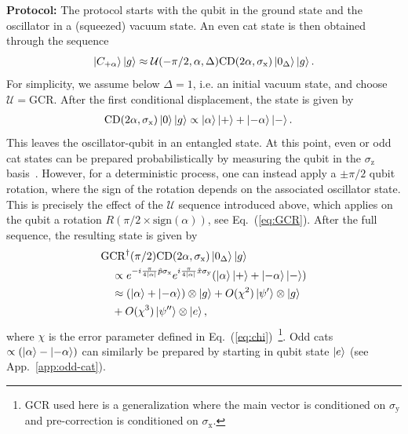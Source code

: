 \documentclass[aps,prx,showpacs,notitlepage,twocolumn,superscriptaddress,nofootinbib,preprintnumbers,floatfix,10pt, longbibliography]{revtex4-2}
\begin{document}
\par\textbf{Protocol:} The protocol starts with the qubit in the ground state and the oscillator in a (squeezed) vacuum state. An even cat state is then obtained through the sequence
\begin{equation}
    \ket{C_{+\alpha}} \ket{g} \approx \mathcal U(-\pi/2,\alpha,\Delta) \mathrm{CD}(2\alpha,\sigma_\mathrm{x}) \ket{0_\Delta}\ket{g}.
\end{equation}
For simplicity, we assume below $\Delta=1$, i.e. an initial vacuum state, and choose $\mathcal U = \mathrm{GCR}$. After the first conditional displacement, the state is given by
\begin{align}
  \mathrm{CD}(2\alpha,\sigma_\mathrm{x})\ket{0}\ket{g}&\propto\ket{\alpha}\ket{+}+\ket{-\alpha}\ket{-}.
\end{align} 
This leaves the oscillator-qubit in an entangled state. At this point, even or odd cat states can be prepared probabilistically by measuring the qubit in the $\sigma_\mathrm{z}$ basis~\cite{sun2014tracking,wineland2013nobel,haroche2013nobel}. However, for a deterministic process, one can instead apply a $\pm \pi/2$ qubit rotation, where the sign of the rotation depends on the associated oscillator state. This is precisely the effect of the $\mathcal U$ sequence introduced above, which applies on the qubit a rotation $R(\pi/2 \times \mathrm{sign}(\alpha))$, see Eq.~(\ref{eq:GCR}). After the full sequence, the resulting state is given by
\begin{equation}\label{eq:cat-state}
\begin{aligned}
  &\mathrm{GCR}^\dagger(\pi/2) \mathrm{CD}(2\alpha,\sigma_\mathrm{x}) \ket{0_\Delta}\ket{g}\\
   &\quad\propto e^{-i\frac{\pi}{4|\alpha|}\hat p \sigma_\mathrm{x}}e^{i\frac{\pi}{4|\alpha|}\hat x \sigma_\mathrm{y}}(\ket{\alpha}\ket{+}+\ket{-\alpha}\ket{-})\\
  &\quad\approx (\ket{\alpha}+\ket{-\alpha})\otimes\ket{g}+O(\chi^2)\ket{\psi'}\otimes\ket{g}\\
  &\quad +O(\chi^3)\ket{\psi''}\otimes\ket{e},
\end{aligned}
\end{equation}
where $\chi$ is the error parameter defined in Eq.~(\ref{eq:chi})~\footnote{GCR used here is a generalization where the main vector is conditioned on $\sigma_\mathrm{y}$ and pre-correction is conditioned on $\sigma_\mathrm{x}$.}. Odd cats $\propto(\ket{\alpha}-\ket{-\alpha})$ can similarly be prepared by starting in qubit state $\ket{e}$ (see App.~\ref{app:odd-cat}). 
\end{document}
